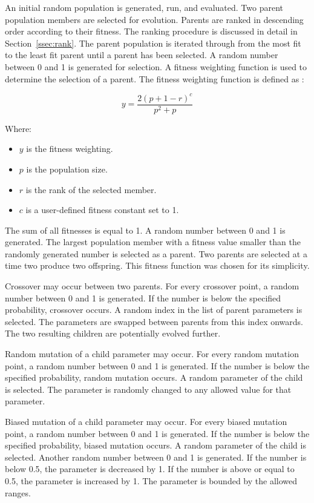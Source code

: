 An initial random population is generated, run, and evaluated. Two parent population members are selected for evolution. Parents are ranked in descending order according to their fitness. The ranking procedure is discussed in detail in Section~\ref{ssec:rank}. The parent population is iterated through from the most fit to the least fit parent until a parent has been selected. A random number between 0 and 1 is generated for selection. A fitness weighting function is used to determine the selection of a parent. The fitness weighting function is defined as \citep{Groenwold1999}:

\begin{equation}
	y=\frac{2\left ( p+1-r \right )^{c}}{p^{2}+p}
\end{equation}

Where:

\begin{itemize}
	\item $y$ is the fitness weighting.
	\item $p$ is the population size.
	\item $r$ is the rank of the selected member.
	\item $c$ is a user-defined fitness constant set to 1.
\end{itemize}

The sum of all fitnesses is equal to 1. A random number between 0 and 1 is generated. The largest population member with a fitness value smaller than the randomly generated number is selected as a parent. Two parents are selected at a time two produce two offspring. This fitness function was chosen for its simplicity.

Crossover may occur between two parents. For every crossover point, a random number between 0 and 1 is generated. If the number is below the specified probability, crossover occurs. A random index in the list of parent parameters is selected. The parameters are swapped between parents from this index onwards. The two resulting children are potentially evolved further.

Random mutation of a child parameter may occur. For every random mutation point, a random number between 0 and 1 is generated. If the number is below the specified probability, random mutation occurs. A random parameter of the child is selected. The parameter is randomly changed to any allowed value for that parameter.

Biased mutation of a child parameter may occur. For every biased mutation point, a random number between 0 and 1 is generated. If the number is below the specified probability, biased mutation occurs. A random parameter of the child is selected. Another random number between 0 and 1 is generated. If the number is below 0.5, the parameter is decreased by 1. If the number is above or equal to 0.5, the parameter is increased by 1. The parameter is bounded by the allowed ranges.

